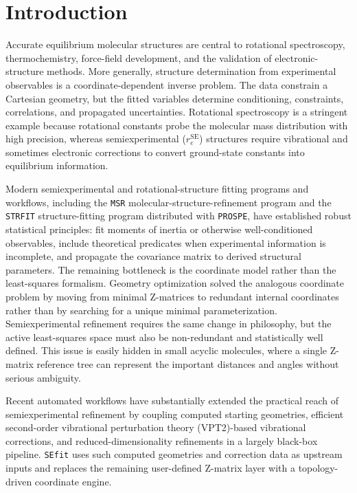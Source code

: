 \documentclass[journal=jctcce,manuscript=article,maxauthors=999]{achemso}
\begin{document}
\section{Introduction}

Accurate equilibrium molecular structures are central to rotational
spectroscopy, thermochemistry, force-field development, and the validation of
electronic-structure methods.\cite{Demaison2011EquilibriumStructures,PuzzariniStanton2023}
More generally, structure determination from experimental observables is a
coordinate-dependent inverse problem. The data constrain a Cartesian geometry,
but the fitted variables determine conditioning, constraints, correlations, and
propagated uncertainties. Rotational spectroscopy is a stringent example because
rotational constants probe the molecular mass distribution with high precision,
whereas semiexperimental ($r_e^{\mathrm{SE}}$) structures require vibrational
and sometimes electronic corrections to convert ground-state constants into
equilibrium information.\cite{Costain1958,Pawlowski2002,Piccardo2015B3LYP,Penocchio2015B2PLYP}

Modern semiexperimental and rotational-structure fitting programs and
workflows, including the \texttt{MSR} molecular-structure-refinement program
and the \texttt{STRFIT} structure-fitting program distributed with
\texttt{PROSPE},\cite{Mendolicchio2017MSR,KisielPROSPE,Kanzow2025PCCP} have
established robust statistical principles: fit moments of inertia or otherwise
well-conditioned observables, include theoretical predicates when experimental
information is incomplete, and propagate the covariance matrix to derived
structural parameters.\cite{Bartell1975Predicate} The remaining bottleneck is
the coordinate model rather than the least-squares formalism.
Geometry optimization solved the analogous coordinate problem by moving from
minimal Z-matrices to redundant internal coordinates rather than by searching
for a unique minimal parameterization. Semiexperimental refinement requires
the same change in philosophy, but the active least-squares space must also be
non-redundant and statistically well defined.
This issue is easily hidden in small acyclic molecules, where a single
Z-matrix reference tree can represent the important distances and angles
without serious ambiguity.

Recent automated workflows have substantially extended the practical reach of
semiexperimental refinement by coupling computed starting geometries, efficient
second-order vibrational perturbation theory (VPT2)-based vibrational
corrections, and reduced-dimensionality refinements in a largely black-box
pipeline.\cite{Mendolicchio2025FastDvib} \texttt{SEfit} uses such computed
geometries and correction data as upstream inputs and replaces the remaining
user-defined Z-matrix layer with a topology-driven coordinate engine.
\end{document}

